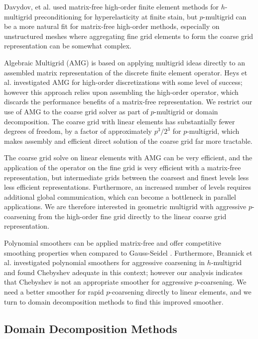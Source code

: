 Davydov, et al. \cite{davydov2019matrix} used matrix-free high-order finite element methods for $h$-multigrid preconditioning for hyperelasticity at finite stain, but $p$-multigrid can be a more natural fit for matrix-free high-order methods, especially on unstructured meshes where aggregating fine grid elements to form the coarse grid representation can be somewhat complex.

Algebraic Multigrid (AMG) is based on applying multigrid ideas directly to an assembled matrix representation of the discrete finite element operator.
Heys et al. \cite{heys2005algebraic} investigated AMG for high-order discretizations with some level of success; however this approach relies upon assembling the high-order operator, which discards the performance benefits of a matrix-free representation.
We restrict our use of AMG to the coarse grid solver as part of $p$-multigrid or domain decomposition.
The coarse grid with linear elements has substantially fewer degrees of freedom, by a factor of approximately $p^3 / 2^3$ for $p$-multigrid, which makes assembly and efficient direct solution of the coarse grid far more tractable.

The coarse grid solve on linear elements with AMG can be very efficient, and the application of the operator on the fine grid is very efficient with a matrix-free representation, but intermediate grids between the coarsest and finest levels less less efficient representations.
Furthermore, an increased number of levels requires additional global communication, which can become a bottleneck in parallel applications.
We are therefore interested in geometric multigrid with aggressive $p$-coarsening from the high-order fine grid directly to the linear coarse grid representation.

Polynomial smoothers can be applied matrix-free and offer competitive smoothing properties when compared to Gauss-Seidel \cite{adams2003parallel}.
Furthermore, Brannick et al. \cite{brannick2015polynomial} investigated polynomial smoothers for aggressive coarsening in $h$-multigrid and found Chebyshev adequate in this context; however our analysis indicates that Chebyshev is not an appropriate smoother for aggressive $p$-coarsening.
We need a better smoother for rapid $p$-coarsening directly to linear elements, and we turn to domain decomposition methods to find this improved smoother.

\subsection{Domain Decomposition Methods}

